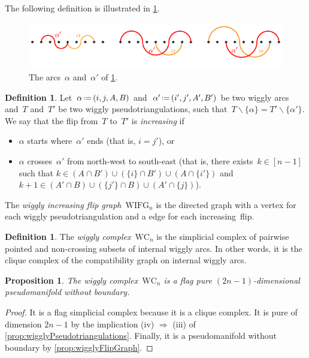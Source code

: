 \documentclass{amsart}
\newtheorem{proposition}[theorem]{Proposition}
\theoremstyle{definition}
\newtheorem{definition}[theorem]{Definition}
\newcommand{\ssm}{\smallsetminus} %
\newcommand{\eqdef}{\mbox{\,\raisebox{0.2ex}{\scriptsize\ensuremath{\mathrm:}}\ensuremath{=}\,}} %
\newcommand{\darkblue}{\color{darkblue}} %
\newcommand{\defn}[1]{\textsl{\darkblue #1}} %
\newcommand{\wigglyComplex}{\mathrm{WC}} %
\newcommand{\wigglyIncreasingFlipGraph}{\mathrm{WIFG}} %
\begin{document}
The following definition is illustrated in \cref{fig:incompatible2}.
%
\begin{figure}
\centerline{\includegraphics[scale=1.3]{incompatible2}}
\caption{The arcs~$\alpha$ and~$\alpha'$ of \cref{def:wigglyIncreasingFlipGraph}.}
\label{fig:incompatible2}
\end{figure}

\begin{definition}
\label{def:wigglyIncreasingFlipGraph}
Let~$\alpha \eqdef (i, j, A, B)$ and~$\alpha' \eqdef (i', j', A', B')$ be two wiggly arcs and~$T$ and~$T'$ be two wiggly pseudotriangulations, such that~$T \ssm \{\alpha\} = T' \ssm \{\alpha'\}$.
We say that the flip from~$T$ to~$T'$ is \defn{increasing} if 
\begin{itemize}
\item $\alpha$ starts where~$\alpha'$ ends (that is, $i = j'$), or 
\item $\alpha$ crosses~$\alpha'$ from north-west to south-east (that is, there exists~$k \in [n-1]$ such that $k \in (A \cap B') \cup (\{i\} \cap B') \cup (A \cap \{i'\})$ and~$k+1 \in (A' \cap B) \cup (\{j'\} \cap B) \cup (A' \cap \{j\})$).
\end{itemize}
The \defn{wiggly increasing flip graph}~$\wigglyIncreasingFlipGraph_n$ is the directed graph with a vertex for each wiggly pseudotriangulation and a edge for each increasing~flip.
\end{definition}

\begin{definition}
The \defn{wiggly complex}~$\wigglyComplex_n$ is the simplicial complex of pairwise pointed and non-crossing subsets of internal wiggly arcs.
In other words, it is the clique complex of the compatibility graph on internal wiggly arcs.
\end{definition}

\begin{proposition}
The wiggly complex~$\wigglyComplex_n$ is a flag pure $(2n-1)$-dimensional pseudomanifold without boundary.
\end{proposition}

\begin{proof}
It is a flag simplicial complex because it is a clique complex.
It is pure of dimension $2n-1$ by the implication (iv) $\Rightarrow$ (iii) of \cref{prop:wigglyPseudotriangulations}.
Finally, it is a pseudomanifold without boundary by \cref{prop:wigglyFlipGraph}.
\end{proof}
\end{document}
